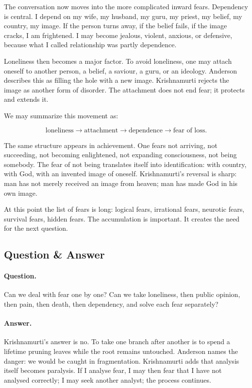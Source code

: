 The conversation now moves into the more complicated inward fears. Dependency is central. I depend on my wife, my husband, my guru, my priest, my belief, my country, my image. If the person turns away, if the belief fails, if the image cracks, I am frightened. I may become jealous, violent, anxious, or defensive, because what I called relationship was partly dependence.

Loneliness then becomes a major factor. To avoid loneliness, one may attach oneself to another person, a belief, a saviour, a guru, or an ideology. Anderson describes this as filling the hole with a new image. Krishnamurti rejects the image as another form of disorder. The attachment does not end fear; it protects and extends it.

We may summarize this movement as:

\begin{equation}
\text{loneliness} \longrightarrow \text{attachment} \longrightarrow \text{dependence} \longrightarrow \text{fear of loss}.
\end{equation}

The same structure appears in achievement. One fears not arriving, not succeeding, not becoming enlightened, not expanding consciousness, not being somebody. The fear of not being translates itself into identification: with country, with God, with an invented image of oneself. Krishnamurti's reversal is sharp: man has not merely received an image from heaven; man has made God in his own image.

At this point the list of fears is long: logical fears, irrational fears, neurotic fears, survival fears, hidden fears. The accumulation is important. It creates the need for the next question.

\subsection{Question \& Answer}

\paragraph{Question.}
Can we deal with fear one by one? Can we take loneliness, then public opinion, then pain, then death, then dependency, and solve each fear separately?

\paragraph{Answer.}
Krishnamurti's answer is no. To take one branch after another is to spend a lifetime pruning leaves while the root remains untouched. Anderson names the danger: we would be caught in fragmentation. Krishnamurti adds that analysis itself becomes paralysis. If I analyse fear, I may then fear that I have not analysed correctly; I may seek another analyst; the process continues.

